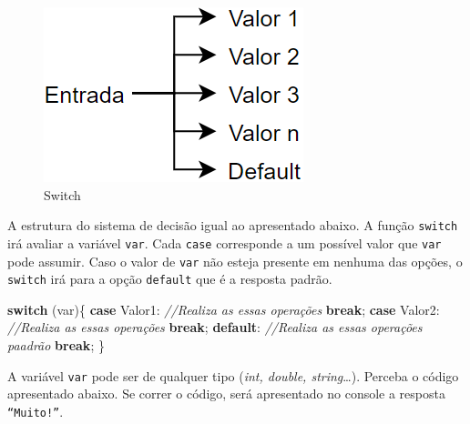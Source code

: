 \documentclass[
]{book}
\newenvironment{Shaded}{\begin{snugshade}}{\end{snugshade}}
\newcommand{\CommentTok}[1]{\textcolor[rgb]{0.56,0.35,0.01}{\textit{#1}}}
\newcommand{\KeywordTok}[1]{\textcolor[rgb]{0.13,0.29,0.53}{\textbf{#1}}}
\newcommand{\NormalTok}[1]{#1}
\begin{document}
\begin{figure}
\centering
\includegraphics{imagens/switch.png}
\caption{Switch}
\end{figure}

A estrutura do sistema de decisão igual ao apresentado abaixo. A função \texttt{switch} irá avaliar a variável \texttt{var}. Cada \texttt{case} corresponde a um possível valor que \texttt{var} pode assumir. Caso o valor de \texttt{var} não esteja presente em nenhuma das opções, o \texttt{switch} irá para a opção \texttt{default} que é a resposta padrão.

\begin{Shaded}
\begin{Highlighting}[]
\KeywordTok{switch}\NormalTok{ (var)\{}
    \KeywordTok{case}\NormalTok{ Valor1:}
        \CommentTok{//Realiza as essas operações}
        \KeywordTok{break}\NormalTok{;}
    \KeywordTok{case}\NormalTok{ Valor2:}
        \CommentTok{//Realiza as essas operações}
        \KeywordTok{break}\NormalTok{;}
    \KeywordTok{default}\NormalTok{:}
        \CommentTok{//Realiza as essas operações paadrão}
        \KeywordTok{break}\NormalTok{;}
\NormalTok{\}}
\end{Highlighting}
\end{Shaded}

A variável \texttt{var} pode ser de qualquer tipo (\emph{int, double, string}\ldots). Perceba o código apresentado abaixo. Se correr o código, será apresentado no console a resposta \texttt{“Muito!”}.
\end{document}
